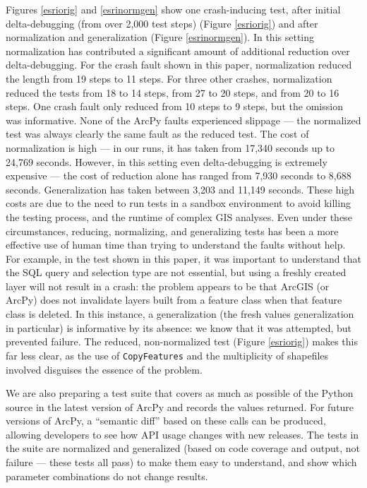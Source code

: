 
Figures \ref{esriorig} and
\ref{esrinormgen} show one crash-inducing test, after initial
delta-debugging (from over 2,000 test steps) (Figure \ref{esriorig})
and after normalization and generalization (Figure \ref{esrinormgen}).
In this setting normalization has contributed a significant amount of
additional reduction over delta-debugging.  For the crash fault shown
in this paper, normalization reduced the length from 19 steps to 11
steps.  For three other crashes, normalization reduced the tests
from 18 to 14 steps, from 27 to 20 steps, and from 20 to 16 steps. One crash fault only reduced from 10 steps to 9 steps, but the
omission was informative.  None of the ArcPy faults experienced slippage --- the normalized
test was always clearly the same fault as the reduced test.
 The cost of normalization is high --- in
our runs, it has taken from 17,340 seconds up to 24,769 seconds.
However, in this setting even delta-debugging is extremely expensive
--- the cost of reduction alone has ranged from 7,930 seconds to 8,688
seconds.  Generalization has taken between 3,203 and
 11,149 seconds.  These high costs are due to the need to run
tests in a sandbox environment to avoid killing the testing
process, and the runtime of complex GIS analyses.
Even under these circumstances, reducing, normalizing, and
generalizing tests has been a more effective use of human time than
trying to understand the faults without help.  For example, in
the test shown in this paper, it was important to understand that
the SQL query and selection type are not essential, but using a
freshly created layer will not result in a crash: the problem appears
to be that ArcGIS (or ArcPy) does not invalidate layers built from a
feature class when that feature class is deleted.  In this
  instance, a generalization (the fresh values generalization in
  particular) is informative by its absence: we know that it was attempted, but prevented
  failure.  The reduced, non-normalized test (Figure \ref{esriorig})
makes this far less clear, as the use of {\tt CopyFeatures} and the
multiplicity of shapefiles involved disguises the essence of the
problem.  

We are also preparing a test suite that covers as much as
possible of the Python source in the latest version of ArcPy
and records the values returned.  For future versions of ArcPy, a ``semantic diff'' based on these calls
can be produced, allowing developers to see how API usage changes with
new releases.  The tests in the suite are
normalized and generalized (based on code coverage and output, not
failure --- these tests all pass) to make them easy to understand, and show
which parameter combinations do not change results.


